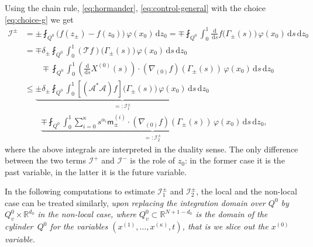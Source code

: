 \documentclass[JEP,XML,SOM,Unicode,NoFloatCountersInSection,published]{cedram}
\theoremstyle{definition}
\newcommand\R{{\mathbb R}}
\newcommand{\cI}{{\mathcal I}}
\newcommand\ds{{\frac{\mathrm d}{\mathrm ds}}}
\newcommand{\dd}{{\, \mathrm d}}
\begin{document}
Using the chain rule, \eqref{eq:hormander},
\eqref{eq:control-general} with the choice \eqref{eq:choice-g} we
get
\begin{equation}
\label{eq:I1-I2}
\begin{aligned}
\cI^\pm & = \pm \fint_{Q^0} \Big(f(z_\pm) -
f(z_0)\Big) \, \varphi(x_0) \dd z_0  = \mp \fint_{Q^0} \int_0^1 \frac{\dd}{\dd
s}f\big(\Gamma_\pm(s)\big) \, \varphi(x_0)\dd s\dd z_0 \\
& = \mp\delta_\pm \fint_{Q^0} \int_0^1 \left(\mathcal T
f \right)\big(\Gamma_\pm(s)\big) \, \varphi(x_0)\dd s\dd z_0 \\
& \qquad \mp \fint_{Q^0} \int_0^1 \left(\ds X^{(0)}(s) \right)
\cdot \left(\nabla_{(0)} f\right)(\Gamma_\pm(s)) \, \varphi(x_0)\dd s \dd
z_0 \\
& \leq \underbrace{\pm\delta_\pm \fint_{Q^0} \int_0^1
\left[ \left(\mathcal A^* \mathcal A \right) f\right]
\big(\Gamma_\pm(s)\big) \, \varphi(x_0)\dd s\dd z_0}_{=:
\cI^\pm_1} \\
& \qquad \underbrace{\mp\fint_{Q^0} \int_0^1 \sum_{i =
0}^\kappa s^{\alpha_i} \mathsf m_\pm^{(i)}
\cdot \left(\nabla_{(0)} f \right)(\Gamma_\pm(s)) \,
\varphi(x_0)\dd s \dd z_0}_{=: \cI^\pm_2},
\end{aligned}
\end{equation}
where the above integrals are interpreted in the duality sense. The only difference between the two terms $\cI^+$ and
$\cI^-$ is the role of $z_0$: in the former case it is the past
variable, in the latter it is the future variable.

In the following computations to estimate $\mathcal I_1^\pm$ and $\mathcal I_2^\pm$,
the local and the non-local case can be treated similarly,
\textit{upon replacing the integration domain over $Q^0$
by \hbox{$Q^0_v \times \R^{d_0}$} in the non-local case,
where $Q^0_v \subset \R^{N + 1 - d_0}$ is the domain of the cylinder~$Q^0$
for the variables $(x^{(1)}, \dots, x^{(\kappa)}, t)$,
that is we slice out the $x^{(0)}$ variable.}
\end{document}
